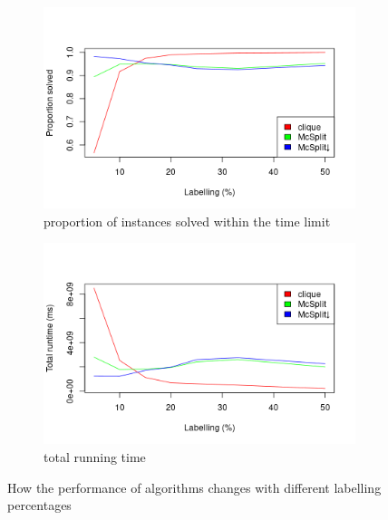 \documentclass{l4proj}
\theoremstyle{definition}
\theoremstyle{remark}
\begin{document}
\begin{figure}
  \centering
  \begin{subfigure}[t]{0.49\textwidth}
    \centering
    \includegraphics[width=\textwidth]{images/both_labels_linechart.png}
    \caption{proportion of instances solved within the time limit}
    \label{fig:both_labels_linechart1}
  \end{subfigure}
  \begin{subfigure}[t]{0.49\textwidth}
    \centering
    \includegraphics[width=\textwidth]{images/both_labels_linechart2.png}
    \caption{total running time}
    \label{fig:both_labels_linechart2}
  \end{subfigure}
  \caption{How the performance of algorithms changes with different labelling
    percentages}
  \label{fig:both_labels_linecharts}
\end{figure}
\end{document}
